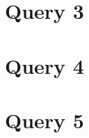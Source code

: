 \documentclass[a4paper,12pt]{article}
\begin{document}
\begin{otherlanguage}{greek}
\section*{Query 3}
	\lipsum[3] %

\section*{Query 4}
	\lipsum[4] %

\section*{Query 5}
	\lipsum[5] %

\FloatBarrier
\printbibliography

\end{otherlanguage}
\end{document}
